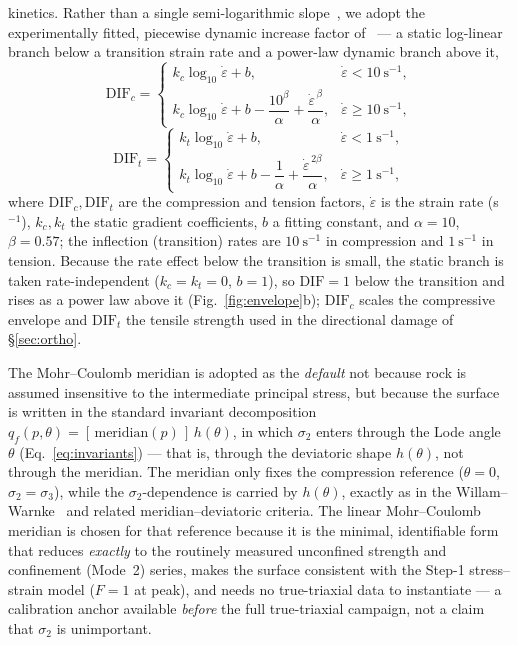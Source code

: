 \documentclass[sn-basic]{sn-jnl}
\begin{document}
kinetics. Rather than a single semi-logarithmic slope~\citep{zhao2000}, we adopt
the experimentally fitted, piecewise dynamic increase factor
of~\citet{ZHU2024105948} --- a static log-linear branch below a transition strain
rate and a power-law dynamic branch above it,
\begin{equation}
\mathrm{DIF}_c=
\begin{cases}
k_c\log_{10}\dot\varepsilon+b, & \dot\varepsilon<10~\mathrm{s^{-1}},\\[3pt]
k_c\log_{10}\dot\varepsilon+b-\dfrac{10^{\beta}}{\alpha}+\dfrac{\dot\varepsilon^{\,\beta}}{\alpha}, & \dot\varepsilon\ge10~\mathrm{s^{-1}},
\end{cases}
\label{eq:difc}
\end{equation}
\begin{equation}
\mathrm{DIF}_t=
\begin{cases}
k_t\log_{10}\dot\varepsilon+b, & \dot\varepsilon<1~\mathrm{s^{-1}},\\[3pt]
k_t\log_{10}\dot\varepsilon+b-\dfrac{1}{\alpha}+\dfrac{\dot\varepsilon^{\,2\beta}}{\alpha}, & \dot\varepsilon\ge1~\mathrm{s^{-1}},
\end{cases}
\label{eq:dift}
\end{equation}
where $\mathrm{DIF}_c,\mathrm{DIF}_t$ are the compression and tension factors,
$\dot\varepsilon$ is the strain rate (s$^{-1}$), $k_c,k_t$ the static gradient
coefficients, $b$ a fitting constant, and $\alpha=10$, $\beta=0.57$; the
inflection (transition) rates are $10~\mathrm{s^{-1}}$ in compression and
$1~\mathrm{s^{-1}}$ in tension. Because the rate effect below the transition is
small, the static branch is taken rate-independent ($k_c=k_t=0$, $b=1$), so
$\mathrm{DIF}=1$ below the transition and rises as a power law above it
(Fig.~\ref{fig:envelope}b); $\mathrm{DIF}_c$ scales the compressive envelope and
$\mathrm{DIF}_t$ the tensile strength used in the directional damage of
\S\ref{sec:ortho}.

The Mohr--Coulomb meridian is adopted as the \emph{default} not because rock is
assumed insensitive to the intermediate principal stress, but because the surface
is written in the standard invariant decomposition
$q_f(p,\theta)=[\,\text{meridian}(p)\,]\,h(\theta)$, in which $\sigma_2$ enters
through the Lode angle $\theta$ (Eq.~\eqref{eq:invariants}) --- that is, through the
deviatoric shape $h(\theta)$, not through the meridian. The meridian only fixes the
compression reference ($\theta=0$, $\sigma_2=\sigma_3$), while the
$\sigma_2$-dependence is carried by $h(\theta)$, exactly as in the
Willam--Warnke~\citep{willam1975} and related meridian--deviatoric criteria. The
linear Mohr--Coulomb meridian is chosen for that reference because it is the
minimal, identifiable form that reduces \emph{exactly} to the routinely measured
unconfined strength and confinement (Mode~2) series, makes the surface consistent
with the Step-1 stress--strain model ($F=1$ at peak), and needs no true-triaxial
data to instantiate --- a calibration anchor available \emph{before} the full
true-triaxial campaign, not a claim that $\sigma_2$ is unimportant.
\end{document}
